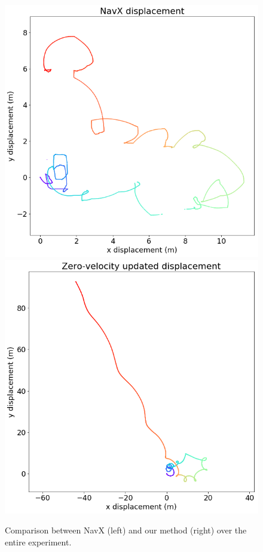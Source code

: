 \documentclass{article}
\begin{document}
		\begin{figure}[H]
			\centering
			\includegraphics[width=0.49\linewidth]{./images/navx-displacement.png}
			\includegraphics[width=0.49\linewidth]{./images/zeroed-displacement.png}
			\caption{Comparison between NavX (left) and our method (right) over the entire experiment.}
			\label{fig:displacement_comparison}
		\end{figure}
\end{document}
